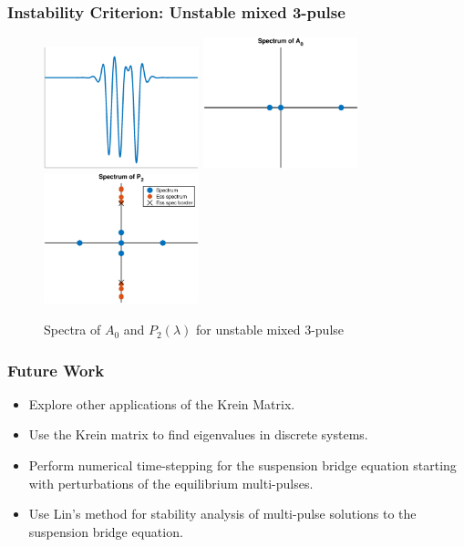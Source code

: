 \documentclass[16pt]{beamer}
\begin{document}
\begin{frame}
\frametitle{Instability Criterion: Unstable mixed 3-pulse}
\begin{figure}
\begin{center}
\includegraphics[width=4.5cm]{images/unstable2.eps}
\includegraphics[width=4.5cm]{images/unstable2A0.eps}
\includegraphics[width=4.5cm]{images/unstable2spec.eps}
\caption{Spectra of $A_0$ and $P_2(\lambda)$ for unstable mixed 3-pulse}
\end{center}
\end{figure}
\end{frame}

\begin{frame}
\frametitle{Future Work}
    \begin{itemize}
      \item Explore other applications of the Krein Matrix.
      \item Use the Krein matrix to find eigenvalues in discrete systems.
      \item Perform numerical time-stepping for the suspension bridge equation starting with perturbations of the equilibrium multi-pulses.
      \item Use Lin's method for stability analysis of multi-pulse solutions to the suspension bridge equation.
    \end{itemize} 
\end{frame}
\end{document}
